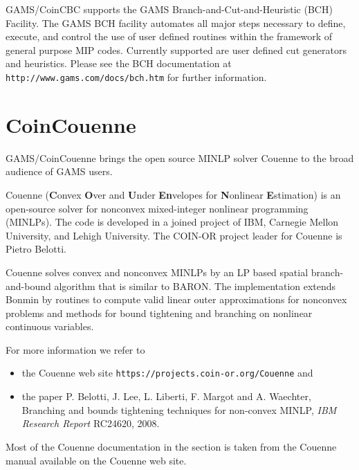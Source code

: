 GAMS/CoinCBC supports the GAMS Branch-and-Cut-and-Heuristic (BCH) Facility.
The GAMS BCH facility automates all major steps necessary to define, execute, and control the use of user defined routines within the framework of general purpose MIP codes.
Currently supported are user defined cut generators and heuristics.
Please see the BCH documentation at \texttt{http://www.gams.com/docs/bch.htm} for further information.





\section{CoinCouenne}

GAMS/CoinCouenne brings the open source MINLP solver Couenne to the broad audience of GAMS users.

Couenne (\textbf{C}onvex \textbf{O}ver and \textbf{U}nder \textbf{En}velopes for \textbf{N}onlinear \textbf{E}stimation) is an open-source solver for nonconvex mixed-integer nonlinear programming (MINLPs).
The code is developed in a joined project of IBM, Carnegie Mellon University, and Lehigh University.
The COIN-OR project leader for Couenne is Pietro Belotti.

Couenne solves convex and nonconvex MINLPs by an LP based spatial branch-and-bound algorithm that is similar to BARON.
The implementation extends Bonmin by routines to compute valid linear outer approximations for nonconvex problems and methods for bound tightening and branching on nonlinear continuous variables.

For more information we refer to
\begin{itemize}
\item the Couenne web site \texttt{https://projects.coin-or.org/Couenne} and
\item the paper P. Belotti, J. Lee, L. Liberti, F. Margot and A. Waechter, Branching and bounds tightening techniques for non-convex MINLP, \emph{IBM Research Report} RC24620, 2008.
\end{itemize}
Most of the Couenne documentation in the section is taken from the Couenne manual available on the Couenne web site.

